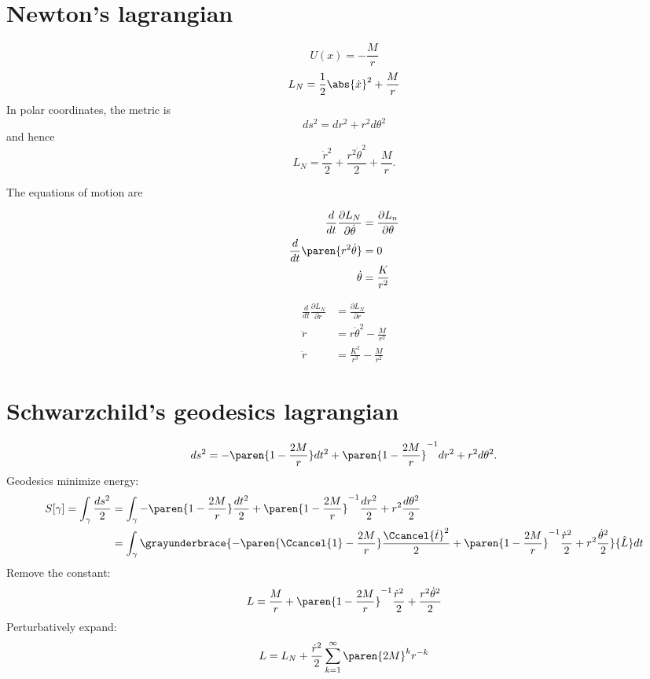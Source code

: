 \documentclass{scrartcl}
\begin{document}
\section{Newton's lagrangian}
\[
  U(x) = -\frac{M}{r}
\]
\[
  L_N = \frac{1}{2}\abs{\dot x}^2 + \frac{M}{r}
\]
In polar coordinates, the metric is
\[
  ds^2 = dr^2 +r^2d\theta^2
\]
and hence
\[
  L_N = \frac{\dot r^2}{2} + \frac{r^2\dot \theta^2}2 + \frac{M}{r}.
\]

The equations of motion are \\
\begin{minipage}{.5\linewidth}
  \begin{align*}
    \frac{d}{dt}\frac{\partial L_N}{\partial \dot\theta} &= \frac{\partial L_n}{\partial \theta} \\
    \frac{d}{dt}\paren{r^2\dot\theta} &= 0 \\
    \dot\theta &= \frac{K}{r^2}
  \end{align*}
\end{minipage}
\begin{minipage}{.5\linewidth}
\begin{align*}
  \frac{d}{dt}\frac{\partial L_N}{\partial \dot r} &= \frac{\partial L_N}{\partial r} \\
  \ddot r &=r\dot\theta^2 - \frac{M}{r^2}  \\
  \ddot r &=\frac{K^2}{r^3} - \frac{M}{r^2}
\end{align*}
\end{minipage}

\section{Schwarzchild's geodesics lagrangian}
\[
  ds^2 = - \paren{1-\frac{2M}{r}} dt^2 + \paren{1-\frac{2M}{r}}^{-1} dr^2 + r^2 d\theta^2.
\]
Geodesics minimize energy:
\begin{align*}
  S[\gamma] = \int_\gamma \frac{ds^2}2 &= \int_\gamma{ -\paren{1-\frac{2M}r}\frac{dt^2}2 + \paren{1-\frac{2M}r}^{-1}\frac{dr^2}2 + r^2\frac{d\theta^2}2}\\
                               &= \int_\gamma\grayunderbrace{ -\paren{\Ccancel{1}-\frac{2M}r}\frac{\Ccancel{\dot t}^2}2 + \paren{1-\frac{2M}r}^{-1}\frac{{\dot r}^2}2 + r^2\frac{{\dot \theta}^2}2}{\hat L}dt
\end{align*}
Remove the constant:
\[
  L = \frac{M}{r} + \paren{1-\frac{2M}{r}}^{-1}\frac{\dot r^2}{2} + \frac{r^2\dot\theta^2}{2}
\]
Perturbatively expand:
\[
  L = L_N + \frac{\dot r^2}{2} \sum_{k=1}^\infty \paren{2M}^k r^{-k}
\]
\end{document}
